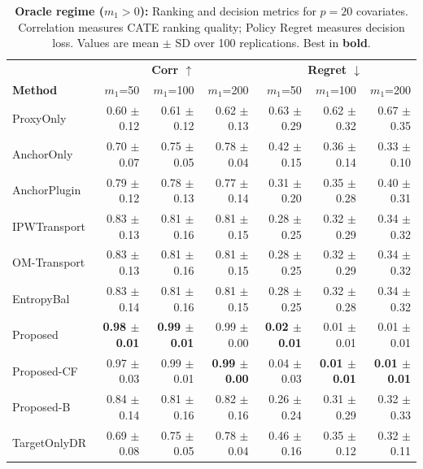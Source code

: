 \begin{table}[t]
\centering
\scriptsize
\setlength{\tabcolsep}{4pt}
\renewcommand{\arraystretch}{1.15}
\begin{tabular}{l|rrr|rrr}
\hline
& \multicolumn{3}{c|}{\textbf{Corr $\uparrow$}} & \multicolumn{3}{c}{\textbf{Regret $\downarrow$}} \\
\textbf{Method} & $m_1$=50 & $m_1$=100 & $m_1$=200 & $m_1$=50 & $m_1$=100 & $m_1$=200 \\
\hline
ProxyOnly & 0.60 $\pm$ 0.12 & 0.61 $\pm$ 0.12 & 0.62 $\pm$ 0.13 & 0.63 $\pm$ 0.29 & 0.62 $\pm$ 0.32 & 0.67 $\pm$ 0.35 \\
AnchorOnly & 0.70 $\pm$ 0.07 & 0.75 $\pm$ 0.05 & 0.78 $\pm$ 0.04 & 0.42 $\pm$ 0.15 & 0.36 $\pm$ 0.14 & 0.33 $\pm$ 0.10 \\
AnchorPlugin & 0.79 $\pm$ 0.12 & 0.78 $\pm$ 0.13 & 0.77 $\pm$ 0.14 & 0.31 $\pm$ 0.20 & 0.35 $\pm$ 0.28 & 0.40 $\pm$ 0.31 \\
IPWTransport & 0.83 $\pm$ 0.13 & 0.81 $\pm$ 0.16 & 0.81 $\pm$ 0.15 & 0.28 $\pm$ 0.25 & 0.32 $\pm$ 0.29 & 0.34 $\pm$ 0.32 \\
OM-Transport & 0.83 $\pm$ 0.13 & 0.81 $\pm$ 0.16 & 0.81 $\pm$ 0.15 & 0.28 $\pm$ 0.25 & 0.32 $\pm$ 0.29 & 0.34 $\pm$ 0.32 \\
EntropyBal & 0.83 $\pm$ 0.14 & 0.81 $\pm$ 0.16 & 0.81 $\pm$ 0.15 & 0.28 $\pm$ 0.25 & 0.32 $\pm$ 0.28 & 0.34 $\pm$ 0.32 \\
Proposed & \textbf{0.98 $\pm$ 0.01} & \textbf{0.99 $\pm$ 0.01} & 0.99 $\pm$ 0.00 & \textbf{0.02 $\pm$ 0.01} & 0.01 $\pm$ 0.01 & 0.01 $\pm$ 0.01 \\
Proposed-CF & 0.97 $\pm$ 0.03 & 0.99 $\pm$ 0.01 & \textbf{0.99 $\pm$ 0.00} & 0.04 $\pm$ 0.03 & \textbf{0.01 $\pm$ 0.01} & \textbf{0.01 $\pm$ 0.01} \\
Proposed-B & 0.84 $\pm$ 0.14 & 0.81 $\pm$ 0.16 & 0.82 $\pm$ 0.16 & 0.26 $\pm$ 0.24 & 0.31 $\pm$ 0.29 & 0.32 $\pm$ 0.33 \\
TargetOnlyDR & 0.69 $\pm$ 0.08 & 0.75 $\pm$ 0.05 & 0.78 $\pm$ 0.04 & 0.46 $\pm$ 0.16 & 0.35 $\pm$ 0.12 & 0.32 $\pm$ 0.11 \\
\hline
\end{tabular}
\caption{
\textbf{Oracle regime ($m_1>0$):} Ranking and decision metrics for $p=20$ covariates.
Correlation measures CATE ranking quality; Policy Regret measures decision loss.
Values are mean $\pm$ SD over 100 replications. Best in \textbf{bold}.
}
\label{tab:oracle-m050-rank}
\end{table}